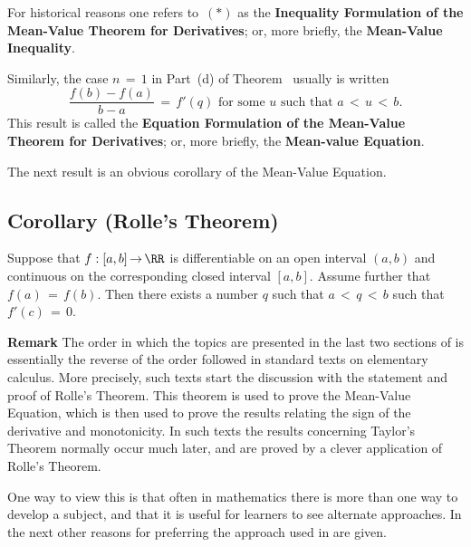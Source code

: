         For historical reasons one refers to~$({\ast})$ as the {\bf Inequality Formulation of the Mean-Value Theorem for Derivatives};
    or, more  briefly, the {\bf Mean-Value Inequality}.

        Similarly, the case $n \,=\, 1$ in Part~(d) of Theorem~ usually is written
        \begin{displaymath}
        \frac{f(b) - f(a)}{b-a} \,=\, f'(q) \mbox{ for some $u$ such that $a\,<\,u\,<\,b$}.
        \end{displaymath}
    This result is called the {\bf Equation Formulation of the Mean-Value Theorem for Derivatives}; or, more briefly, the {\bf Mean-value Equation}.

\V

        The next result is an obvious corollary of the Mean-Value Equation.

\V

            \subsection{\small{\bf Corollary} (Rolle's Theorem)}
            \label{CorE40.69C}

\V

        Suppose that $f:[a,b] \,{\rightarrow}\, {\RR}$ is differentiable on an open interval $(a,b)$
    and continuous on the corresponding closed interval $[a,b]$. Assume further that $f(a) \,=\, f(b)$.
    Then there exists a number $q$ such that $a\,<\,q\,<\,b$ such that $f'(c) \,=\, 0$.
        

\VV

        {\bf Remark} The order in which the topics are presented in the last two sections of {\ThisText}
    is essentially the reverse of the order followed in standard texts on elementary calculus.
    More precisely, such texts start the discussion with the statement and proof of Rolle's Theorem.
    This theorem is used to prove the Mean-Value Equation, which is then used to prove the results relating the sign of the derivative and monotonicity.
    In such texts the results concerning Taylor's Theorem normally occur much later, and are proved by a clever application of Rolle's Theorem.

        One way to view this is that often in mathematics there is more than one way to develop a subject,
    and that it is useful for learners to see alternate approaches. In the next {\Note} other reasons for preferring the approach used in {\ThisText} are given.
    
